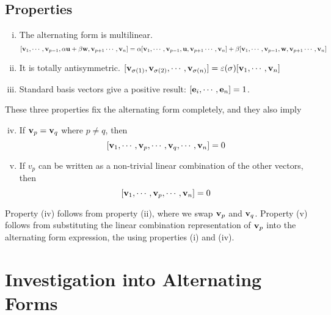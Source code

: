 \documentclass{article}
\begin{document}
\subsection{Properties}
\begin{enumerate}[(i)]
    \item The alternating form is multilinear.
          \[ [ \vb v_1, \cdots, \vb v_{p-1}, \alpha \vb u + \beta \vb w, \vb v_{p+1} \cdots, \vb v_n ] = \alpha [ \vb v_1, \cdots, \vb v_{p-1}, \vb u, \vb v_{p+1} \cdots, \vb v_n ] + \beta [ \vb v_1, \cdots, \vb v_{p-1}, \vb w, \vb v_{p+1} \cdots, \vb v_n ] \]
    \item It is totally antisymmetric. $[ \vb v_{\sigma(1)}, \vb v_{\sigma(2)}, \cdots, \vb v_{\sigma(n)} ] = \varepsilon(\sigma) [ \vb v_1, \cdots, \vb v_n ]$
    \item Standard basis vectors give a positive result: $[\vb e_i, \cdots, \vb e_n] = 1$.
\end{enumerate}
These three properties fix the alternating form completely, and they also imply
\begin{enumerate}[(i)]
    \setcounter{enumi}{3}
    \item If $\vb v_p = \vb v_q$ where $p \neq q$, then
          \[ [\vb v_1, \cdots, \vb v_p, \cdots, \vb v_q, \cdots, \vb v_n ] = 0 \]
    \item If $v_p$ can be written as a non-trivial linear combination of the other vectors, then
          \[ [\vb v_1, \cdots, \vb v_p, \cdots, \vb v_n ] = 0 \]
\end{enumerate}
Property (iv) follows from property (ii), where we swap $\vb v_p$ and $\vb v_q$. Property (v) follows from substituting the linear combination representation of $\vb v_p$ into the alternating form expression, the using properties (i) and (iv).

\section{Investigation into Alternating Forms}
\end{document}

